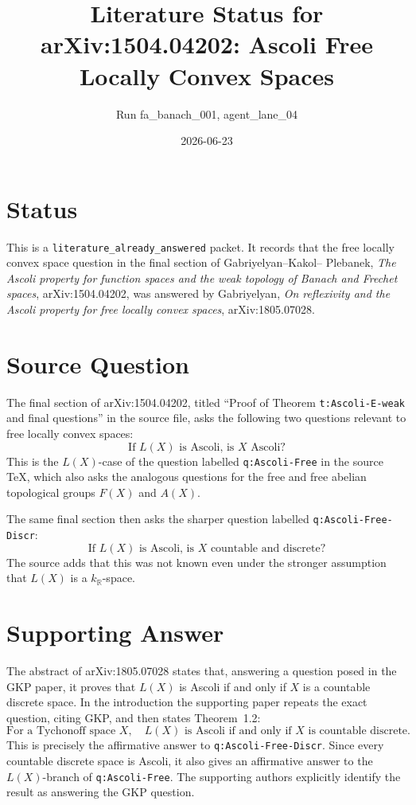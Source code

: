 \documentclass[11pt]{article}
\title{Literature Status for arXiv:1504.04202: Ascoli Free Locally Convex Spaces}
\author{Run fa\_banach\_001, agent\_lane\_04}
\date{2026-06-23}
\newcommand{\KR}{k_{\mathbb R}}
\begin{document}
\maketitle

\section*{Status}

This is a \texttt{literature\_already\_answered} packet. It records that the
free locally convex space question in the final section of Gabriyelyan--Kakol--
Plebanek, \emph{The Ascoli property for function spaces and the weak topology
of Banach and Frechet spaces}, arXiv:1504.04202, was answered by Gabriyelyan,
\emph{On reflexivity and the Ascoli property for free locally convex spaces},
arXiv:1805.07028.

\section*{Source Question}

The final section of arXiv:1504.04202, titled ``Proof of Theorem
\texttt{t:Ascoli-E-weak} and final questions'' in the source file, asks the
following two questions relevant to free locally convex spaces:
\[
  \text{If } L(X) \text{ is Ascoli, is } X \text{ Ascoli?}
\]
This is the \(L(X)\)-case of the question labelled
\texttt{q:Ascoli-Free} in the source TeX, which also asks the analogous
questions for the free and free abelian topological groups \(F(X)\) and
\(A(X)\).

The same final section then asks the sharper question labelled
\texttt{q:Ascoli-Free-Discr}:
\[
  \text{If } L(X) \text{ is Ascoli, is } X \text{ countable and discrete?}
\]
The source adds that this was not known even under the stronger assumption
that \(L(X)\) is a \(\KR\)-space.

\section*{Supporting Answer}

The abstract of arXiv:1805.07028 states that, answering a question posed in
the GKP paper, it proves that \(L(X)\) is Ascoli if and only if \(X\) is a
countable discrete space. In the introduction the supporting paper repeats the
exact question, citing GKP, and then states Theorem~1.2:
\[
  \text{For a Tychonoff space } X,\quad
  L(X) \text{ is Ascoli if and only if } X \text{ is countable discrete.}
\]
This is precisely the affirmative answer to \texttt{q:Ascoli-Free-Discr}.
Since every countable discrete space is Ascoli, it also gives an affirmative
answer to the \(L(X)\)-branch of \texttt{q:Ascoli-Free}. The supporting authors
explicitly identify the result as answering the GKP question.
\end{document}
